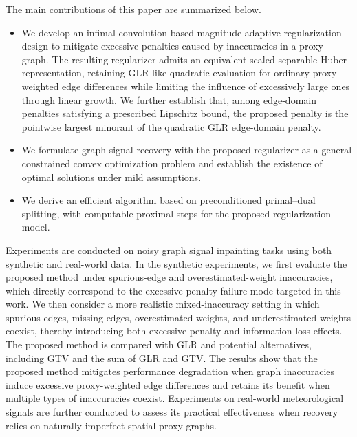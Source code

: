 The main contributions of this paper are summarized below.
\begin{itemize}
\item
We develop an infimal-convolution-based magnitude-adaptive regularization design to mitigate excessive penalties caused by inaccuracies in a proxy graph.
The resulting regularizer admits an equivalent scaled separable Huber representation, retaining GLR-like quadratic evaluation for ordinary proxy-weighted edge differences while limiting the influence of excessively large ones through linear growth.
We further establish that, among edge-domain penalties satisfying a prescribed Lipschitz bound, the proposed penalty is the pointwise largest minorant of the quadratic GLR edge-domain penalty.

\item
We formulate graph signal recovery with the proposed regularizer as a general constrained convex optimization problem and establish the existence of optimal solutions under mild assumptions.

\item
We derive an efficient algorithm based on preconditioned primal--dual splitting, with computable proximal steps for the proposed regularization model.
\end{itemize}

Experiments are conducted on noisy graph signal inpainting tasks using both synthetic and real-world data.
In the synthetic experiments, we first evaluate the proposed method under spurious-edge and overestimated-weight inaccuracies, which directly correspond to the excessive-penalty failure mode targeted in this work.
We then consider a more realistic mixed-inaccuracy setting in which spurious edges, missing edges, overestimated weights, and underestimated weights coexist, thereby introducing both excessive-penalty and information-loss effects.
The proposed method is compared with GLR and potential alternatives, including GTV \cite{berger2017graph} and the sum of GLR and GTV.
The results show that the proposed method mitigates performance degradation when graph inaccuracies induce excessive proxy-weighted edge differences and retains its benefit when multiple types of inaccuracies coexist.
Experiments on real-world meteorological signals are further conducted to assess its practical effectiveness when recovery relies on naturally imperfect spatial proxy graphs.